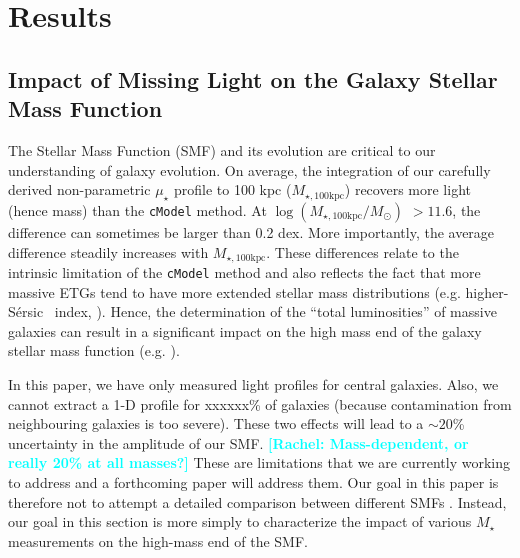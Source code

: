\documentclass[a4paper,fleqn,usenatbib]{mnras}
\def\ser{{S\'{e}rsic\ }}
\def\mstar{{$M_{\star}$}}
\def\mtot{{$M_{\star,100\mathrm{kpc}}$}}
\def\logmtot{{$\log (M_{\star,100\mathrm{kpc}}/M_{\odot})$}}
\def\m2l{{$M_{\star}/L_{\star}$}}
\def\mden{{$\mu_{\star}$}}
\newcommand{\rachel}[1]{\textcolor{cyan}{\textbf{[Rachel: #1]}}}
\begin{document}
\section{Results}
    \label{sec:result}

\subsection{Impact of Missing Light on the Galaxy Stellar Mass Function}
    \label{ssec:smf}
    
    The Stellar Mass Function (SMF) and its evolution are critical to our understanding of galaxy evolution. On average, the integration of our carefully derived non-parametric \mden{} profile 
    to 100 kpc (\mtot{}) recovers more light (hence mass) than the \texttt{cModel} method. 
    At \logmtot{} $>11.6$, the difference can sometimes be larger than 0.2 dex. 
    More importantly, the average difference steadily increases with \mtot{}. 
    These differences relate to the intrinsic limitation of the \texttt{cModel} 
    method and also reflects the fact that more massive ETGs tend to have more 
    extended stellar mass distributions (e.g. higher-\ser{} index, 
    \citealt{Graham2003}). Hence,  the determination of the ``total luminosities'' of massive galaxies can result in  a significant impact 
    on the high mass end of the galaxy stellar mass function (e.g. 
    \citealt{Bernardi2013, DSouza2014, DSouza2015, Bernardi2017}).
    
    
In this paper, we have only measured light profiles for central galaxies. Also,  we cannot extract  a 1-D profile for xxxxxx\% of galaxies (because contamination from neighbouring galaxies is too severe). These two effects will lead to a ${\sim}20$\% uncertainty in  the amplitude of our SMF.  \rachel{Mass-dependent, or really 20\% at all masses?} These are limitations that we are currently working to address and a forthcoming paper will  address them. Our goal in this paper is therefore not  to  attempt a detailed comparison between different SMFs
    \citep[e.g.,][]{Bernardi2013, Bernardi2017}. Instead, our goal in this section is more simply to characterize the  impact of various \mstar{} measurements  on the high-mass end of the SMF.   
    
\end{document}
